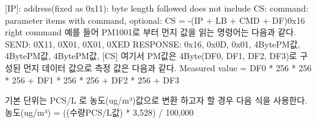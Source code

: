 \documentclass[11pt
  , a4paper
  , article
  , oneside
]{memoir}
\begin{document}
[IP]: address(fixed as 0x11)\newline
[LB]: byte length followed does not include CS\newline
[CMD]: command\newline
[DF]: parameter items with command, optional\newline
[CS]: CS = -(IP + LB + CMD + DF)\newline
[ACK] 0x16 right command\newline
\newline
예를 들어 PM1001로 부터 먼지 값을 읽는 명령어는 다음과 같다.\newline\newline
        SEND: 0X11, 0X01, 0X01, 0XED\newline\newline
        RESPONSE: 0x16, 0x0D, 0x01, 4BytePM값, 4BytePM값, 4BytePM값, [CS]\newline\newline
여기서 PM값은 4Byte(DF0, DF1, DF2, DF3)로 구성된 먼지 데이터 값으로 측정 값은 다음과 같다.\newline\newline
        Measured value = DF0 * 256 * 256 * 256 + DF1 * 256 * 256 + DF2 * 256 + DF3\newline

기본 단위는 PCS/L 로 농도(ug/m³)값으로  변환 하고자 할 경우 다음 식을 사용한다.\newline
\newline
        농도(ug/m³) = ((수량PCS/L값) * 3,528) / 100,000\newline
\end{document}
